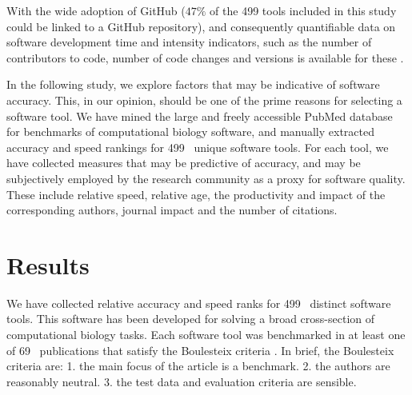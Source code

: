 \documentclass[fleqn,10pt]{SelfArx} %
\def\numTools{499}
\def\numBenchmarkPubs{69}
\begin{document}
With the wide adoption of GitHub ($47\%$ of the
{\color{black}\numTools} tools included in this study could be
linked to a GitHub repository), and consequently quantifiable data on software
development time and intensity indicators, such as the number of contributors to code, number of code
changes and versions is available for these
\cite{ray2014large,Dozmorov:2018,mangul2018comprehensive}.

In the following study, we explore factors that may be indicative of
software accuracy. This, in our opinion, should be one of the prime
reasons for selecting a software tool. We have mined the large and
freely accessible PubMed database \cite{Sayers2010-vm} for benchmarks
of computational biology software, and manually extracted accuracy and
speed rankings for {\color{black}\numTools~} unique software tools. For
each tool, we have collected measures that may be predictive
of accuracy, and may be subjectively employed by the research
community as a proxy for software quality. These include relative
speed, relative age, the productivity and impact of the corresponding
authors, journal impact and the number of citations.

\section*{Results}
We have collected relative accuracy and speed ranks for
{\color{black}\numTools~} distinct software tools. This software has
been developed for solving a broad cross-section of computational biology
tasks.
Each software tool was benchmarked in at least one of
{\color{black}\numBenchmarkPubs~} publications that satisfy the Boulesteix
criteria \cite{Boulesteix2013-vb}. In brief, the Boulesteix criteria
are: 1. the main focus of the article is a benchmark. 2. the authors
are reasonably neutral. 3. the test data and evaluation criteria are
sensible.
\end{document}
